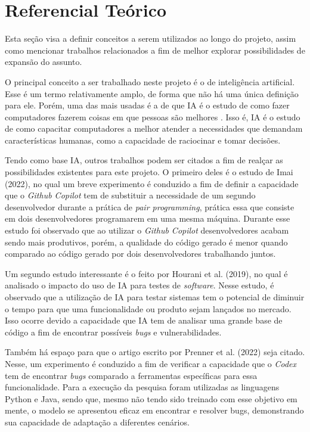 \section{Referencial Teórico}
\label{sec:theory}

Esta seção visa a definir conceitos a serem utilizados ao longo do projeto, assim como mencionar trabalhos relacionados a fim de melhor explorar possibilidades de expansão do assunto.

O principal conceito a ser trabalhado neste projeto é o de inteligência artificial. Esse é um termo relativamente amplo, de forma que não há uma única definição para ele. Porém, uma das mais usadas é a de que IA é o estudo de como fazer computadores fazerem coisas em que pessoas são melhores \cite{ai-and-humanities}. Isso é, IA é o estudo de como capacitar computadores a melhor atender a necessidades que demandam características humanas, como a capacidade de raciocinar e tomar decisões.

Tendo como base IA, outros trabalhos podem ser citados a fim de realçar as possibilidades existentes para este projeto. O primeiro deles é o estudo de Imai (2022)\nocite{copilot-pair-programming}, no qual um breve experimento é conduzido a fim de definir a capacidade que o \textit{Github Copilot} tem de substituir a necessidade de um segundo desenvolvedor durante a prática de \textit{pair programming}, prática essa que consiste em dois desenvolvedores programarem em uma mesma máquina. Durante esse estudo foi observado que ao utilizar o \textit{Github Copilot} desenvolvedores acabam sendo mais produtivos, porém, a qualidade do código gerado é menor quando comparado ao código gerado por dois desenvolvedores trabalhando juntos.

Um segundo estudo interessante é o feito por Hourani et al. (2019)\nocite{ai-impact-in-testing}, no qual é analisado o impacto do uso de IA para testes de \textit{software}. Nesse estudo, é observado que a utilização de IA para testar sistemas tem o potencial de diminuir o tempo para que uma funcionalidade ou produto sejam lançados no mercado. Isso ocorre devido a capacidade que IA tem de analisar uma grande base de código a fim de encontrar possíveis \textit{bugs} e vulnerabilidades.

Também há espaço para que o artigo escrito por Prenner et al. (2022)\nocite{codex-bugfix} seja citado. Nesse, um experimento é conduzido a fim de verificar a capacidade que o \textit{Codex} tem de encontrar \textit{bugs} comparado a ferramentas específicas para essa funcionalidade. Para a execução da pesquisa foram utilizadas as linguagens Python e Java, sendo que, mesmo não tendo sido treinado com esse objetivo em mente, o modelo se apresentou eficaz em encontrar e resolver bugs, demonstrando sua capacidade de adaptação a diferentes cenários.


